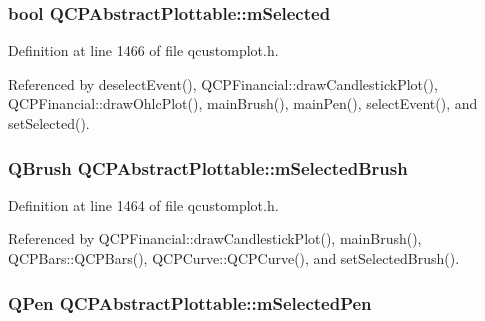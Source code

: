 \hypertarget{class_q_c_p_abstract_plottable_a43f68a0603e9bcd016bdfa6d9d5c41c9}{}
\subsubsection[{m\+Selected}]{\setlength{\rightskip}{0pt plus 5cm}bool Q\+C\+P\+Abstract\+Plottable\+::m\+Selected\hspace{0.3cm}{\ttfamily [protected]}}\label{class_q_c_p_abstract_plottable_a43f68a0603e9bcd016bdfa6d9d5c41c9}


Definition at line 1466 of file qcustomplot.\+h.



Referenced by deselect\+Event(), Q\+C\+P\+Financial\+::draw\+Candlestick\+Plot(), Q\+C\+P\+Financial\+::draw\+Ohlc\+Plot(), main\+Brush(), main\+Pen(), select\+Event(), and set\+Selected().

\hypertarget{class_q_c_p_abstract_plottable_aea3c0da30c7a8be23ad5f2d9bca36762}{}
\subsubsection[{m\+Selected\+Brush}]{\setlength{\rightskip}{0pt plus 5cm}Q\+Brush Q\+C\+P\+Abstract\+Plottable\+::m\+Selected\+Brush\hspace{0.3cm}{\ttfamily [protected]}}\label{class_q_c_p_abstract_plottable_aea3c0da30c7a8be23ad5f2d9bca36762}


Definition at line 1464 of file qcustomplot.\+h.



Referenced by Q\+C\+P\+Financial\+::draw\+Candlestick\+Plot(), main\+Brush(), Q\+C\+P\+Bars\+::\+Q\+C\+P\+Bars(), Q\+C\+P\+Curve\+::\+Q\+C\+P\+Curve(), and set\+Selected\+Brush().

\hypertarget{class_q_c_p_abstract_plottable_a10619472f5d5e10e9519a599f1cf5576}{}
\subsubsection[{m\+Selected\+Pen}]{\setlength{\rightskip}{0pt plus 5cm}Q\+Pen Q\+C\+P\+Abstract\+Plottable\+::m\+Selected\+Pen\hspace{0.3cm}{\ttfamily [protected]}}\label{class_q_c_p_abstract_plottable_a10619472f5d5e10e9519a599f1cf5576}


